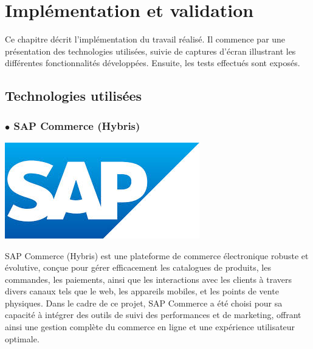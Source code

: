 \chapter{Implémentation et validation}
\label{chap:Implémentation et Validation}


Ce chapitre décrit l'implémentation du travail réalisé. Il commence par une présentation des technologies utilisées, suivie de captures d'écran illustrant les différentes fonctionnalités développées. Ensuite, les tests effectués sont exposés.
\newpage
\section{Technologies utilisées}
\subsection*{$\bullet$ SAP Commerce (Hybris)}
\begin{center}
    \centering
    \includegraphics[scale=0.5]{Figures/SAP.jpg}
    \label{fig:processus}
\end{center} 

SAP Commerce (Hybris) est une plateforme de commerce électronique robuste et évolutive, conçue pour gérer efficacement les catalogues de produits, les commandes, les paiements, ainsi que les interactions avec les clients à travers divers canaux tels que le web, les appareils mobiles, et les points de vente physiques. Dans le cadre de ce projet, SAP Commerce a été choisi pour sa capacité à intégrer des outils de suivi des performances et de marketing, offrant ainsi une gestion complète du commerce en ligne et une expérience utilisateur optimale.

